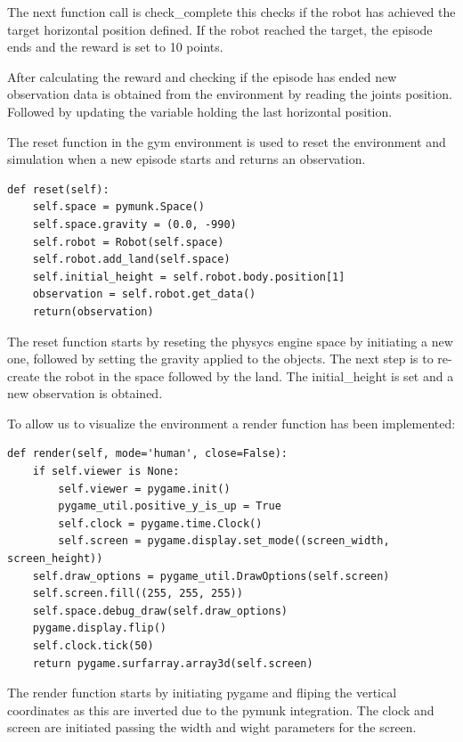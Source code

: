 The next function call is check\_complete this checks if the robot has achieved the target horizontal position defined.
If the robot reached the target, the episode ends and the reward is set to 10 points.

After calculating the reward and checking if the episode has ended new observation data is obtained from the environment by reading the joints position.
Followed by updating the variable holding the last horizontal position.

The reset function in the gym environment is used to reset the environment and simulation when a new episode starts and returns an observation.

\begin{lstlisting}
def reset(self):
    self.space = pymunk.Space()
    self.space.gravity = (0.0, -990)
    self.robot = Robot(self.space)
    self.robot.add_land(self.space)
    self.initial_height = self.robot.body.position[1]
    observation = self.robot.get_data()
    return(observation)
\end{lstlisting}

The reset function starts by reseting the physycs engine space by initiating a new one, followed by setting the gravity applied to the objects. The next step is to re-create the robot in the space followed by the land.
The initial\_height is set and a new observation is obtained.

To allow us to visualize the environment a render function has been implemented:

\begin{lstlisting}
def render(self, mode='human', close=False):
    if self.viewer is None:
        self.viewer = pygame.init()
        pygame_util.positive_y_is_up = True
        self.clock = pygame.time.Clock()
        self.screen = pygame.display.set_mode((screen_width, screen_height))
    self.draw_options = pygame_util.DrawOptions(self.screen)
    self.screen.fill((255, 255, 255))
    self.space.debug_draw(self.draw_options)
    pygame.display.flip()
    self.clock.tick(50)
    return pygame.surfarray.array3d(self.screen)
\end{lstlisting}

The render function starts by initiating pygame and fliping the vertical coordinates as this are inverted due to the pymunk integration. The clock and screen are initiated passing the width and wight parameters for the screen.

